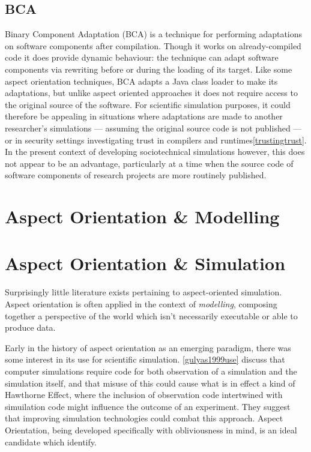 \subsection{BCA}\label{subsec:BCA} Binary Component
Adaptation\cite{keller1998binary} (BCA) is a technique for performing
adaptations on software components after compilation. Though it works on
already-compiled code it does provide dynamic behaviour: the technique can adapt
software components via rewriting before or during the loading of its target.
Like some aspect orientation techniques, BCA adapts a Java class
loader to make its adaptations, but unlike aspect oriented approaches it does
not require access to the original source of the software. For scientific
simulation purposes, it could therefore be appealing in situations where
adaptations are made to another researcher's simulations --- assuming the
original source code is not published --- or in security settings investigating
trust in compilers and runtimes\cref{trustingtrust}. In the present context of
developing sociotechnical simulations however, this does not appear to be an
advantage, particularly at a time when the source code of software components of
research projects are more routinely published.

\section{Aspect Orientation \& Modelling}




\section{Aspect Orientation \& Simulation}

Surprisingly little literature exists pertaining to aspect-oriented simulation.
Aspect orientation is often applied in the context of \emph{modelling},
composing together a perspective of the world which isn't necessarily executable
or able to produce data.

Early in the history of aspect orientation as an emerging paradigm, there was
some interest in its use for scientific simulation. \cref{gulyas1999use} discuss
that computer simulations require code for both observation of a simulation and
the simulation itself, and that misuse of this could cause what is in effect a
kind of Hawthorne Effect, where the inclusion
of observation code intertwined with simuilation code might influence the
outcome of an experiment. They suggest that improving simulation technologies
could combat this approach. Aspect Orientation, being developed specifically
with obliviousness in mind, is an ideal candidate which \citeauthor{gulyas1999use}
identify.

